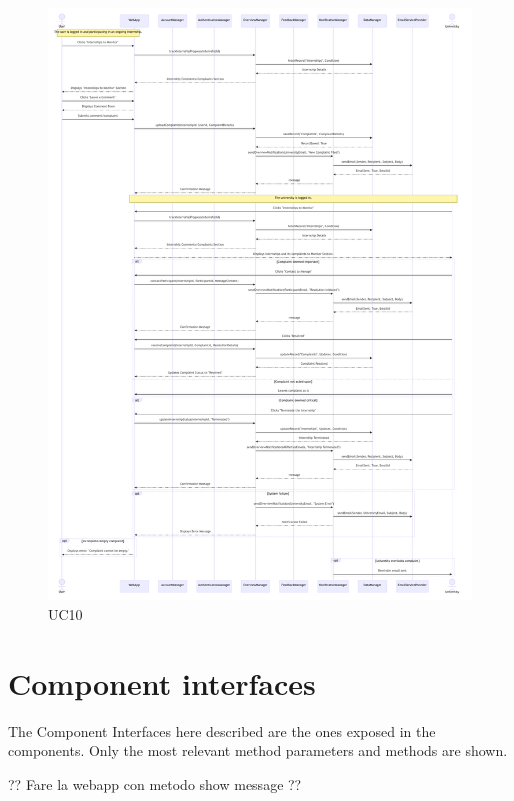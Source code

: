 \begin{figure}[H]
    \centering
    \includegraphics[width=0.9\linewidth]{DD//Images/SequenceDiagrams/UC10.pdf}
    \caption{UC10}
\end{figure}






\section{Component interfaces}
The Component Interfaces here described are the ones exposed in the components. Only the most relevant method parameters and methods
are shown.


?? Fare la webapp con metodo show message ??


